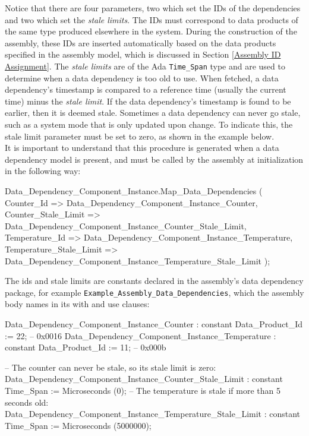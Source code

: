 Notice that there are four parameters, two which set the IDs of the dependencies and two which set the \textit{stale limits}. The IDs must correspond to data products of the same type produced elsewhere in the system. During the construction of the assembly, these IDs are inserted automatically based on the data products specified in the assembly model, which is discussed in Section \ref{Assembly ID Assignment}.  The \textit{stale limits} are of the Ada \texttt{Time\_Span} type and are used to determine when a data dependency is too old to use. When fetched, a data dependency's timestamp is compared to a reference time (usually the current time) minus the \textit{stale limit}. If the data dependency's timestamp is found to be earlier, then it is deemed stale. Sometimes a data dependency can never go stale, such as a system mode that is only updated upon change. To indicate this, the stale limit parameter must be set to zero, as shown in the example below. \\

It is important to understand that this procedure is generated when a data dependency model is present, and must be called by the assembly at initialization in the following way:

\vspace{5mm} %
\begin{adacode}
  Data_Dependency_Component_Instance.Map_Data_Dependencies (
    Counter_Id => Data_Dependency_Component_Instance_Counter,
    Counter_Stale_Limit => Data_Dependency_Component_Instance_Counter_Stale_Limit,
    Temperature_Id => Data_Dependency_Component_Instance_Temperature,
    Temperature_Stale_Limit => Data_Dependency_Component_Instance_Temperature_Stale_Limit
  );
\end{adacode}
\vspace{5mm} %

The ids and stale limits are constants declared in the assembly's data dependency package, for example \texttt{Example\_Assembly\_Data\_Dependencies}, which the assembly body names in its with and use clauses:

\vspace{5mm} %
\begin{adacode}
  Data_Dependency_Component_Instance_Counter : constant Data_Product_Id := 22; -- 0x0016
  Data_Dependency_Component_Instance_Temperature : constant Data_Product_Id := 11; -- 0x000b

  -- The counter can never be stale, so its stale limit is zero:
  Data_Dependency_Component_Instance_Counter_Stale_Limit : constant Time_Span := Microseconds (0);
  -- The temperature is stale if more than 5 seconds old:
  Data_Dependency_Component_Instance_Temperature_Stale_Limit : constant Time_Span := Microseconds (5000000);
\end{adacode}
\vspace{5mm} %

